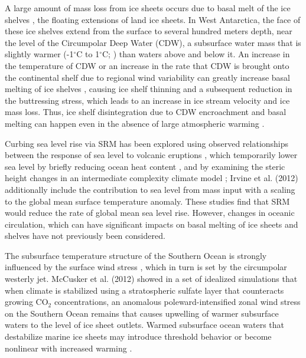\documentclass{nature}
\begin{document}
A large amount of mass loss from ice sheets occurs due to basal melt of the ice shelves \cite{joughin11}, the floating extensions of land ice sheets. In West Antarctica, the face of these ice shelves extend from the surface to several hundred meters depth, near the level of the Circumpolar Deep Water (CDW), a subsurface water mass that is slightly warmer (-1$^\circ$C to 1$^\circ$C; \cite{yin11}) than waters above and below it. An increase in the temperature of CDW or an increase in the rate that CDW is brought onto the continental shelf due to regional wind variability can greatly increase basal melting of ice shelves \cite{thoma08,joughin11}, causing ice shelf thinning and a subsequent reduction in the buttressing stress, which leads to an increase in ice stream velocity and ice mass loss\cite{oppenheimer98,pritchard12}. Thus, ice shelf disintegration due to CDW encroachment and basal melting can happen even in the absence of large atmospheric warming \cite{oppenheimer98}. %

Curbing sea level rise via SRM has been explored using observed relationships between the response of sea level to volcanic eruptions \cite{moore10}, which temporarily lower sea level by briefly reducing ocean heat content \cite{church05,gleckler06}, and by examining the steric height changes in an intermediate complexity climate model \cite{irvine12}; Irvine et al. (2012) additionally include the contribution to sea level from mass input with a scaling to the global mean surface temperature anomaly. These studies find that SRM would reduce the rate of global mean sea level rise. However, changes in oceanic circulation, which can have significant impacts on basal melting of ice sheets and shelves \cite{steig13,joughin11,thoma08} have not previously been considered. 

The subsurface temperature structure of the Southern Ocean is strongly influenced by the surface wind stress \cite{fyfe07,spence14}, which in turn is set by the circumpolar westerly jet. McCusker et al. (2012) showed in a set of idealized simulations that when climate is stabilized using a stratospheric sulfate layer that counteracts growing CO$_2$ concentrations, an anomalous poleward-intensified zonal wind stress on the Southern Ocean remains that causes upwelling of warmer subsurface waters to the level of ice sheet outlets. Warmed subsurface ocean waters that destabilize marine ice sheets may introduce threshold behavior \cite{notz09} or become nonlinear with increased warming \cite{joughin14}.
\end{document}
